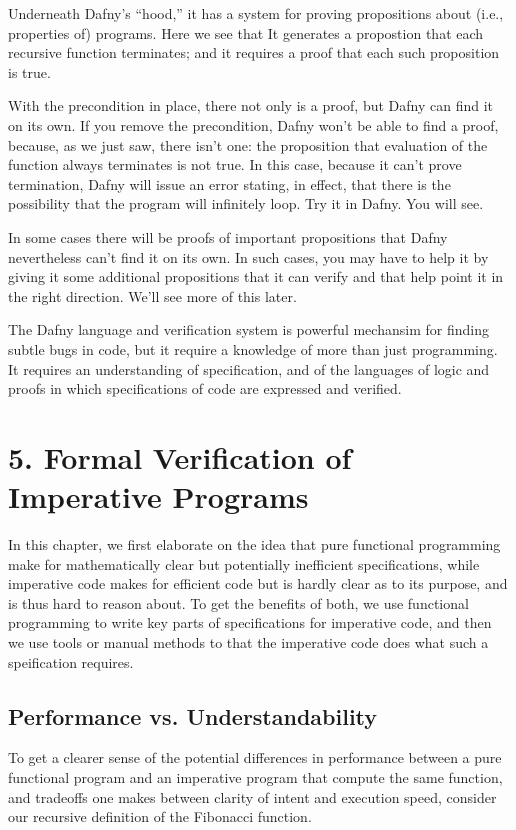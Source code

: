 \documentclass[letterpaper,10pt,english]{sphinxmanual}
\begin{document}
Underneath Dafny’s “hood,” it has a system for proving propositions
about (i.e., properties of) programs. Here we see that It generates a
propostion that each recursive function terminates; and it requires a
proof that each such proposition is true.

With the precondition in place, there not only is a proof, but Dafny
can find it on its own. If you remove the precondition, Dafny won’t be
able to find a proof, because, as we just saw, there isn’t one: the
proposition that evaluation of the function always terminates is not
true. In this case, because it can’t prove termination, Dafny will
issue an error stating, in effect, that there is the possibility that
the program will infinitely loop. Try it in Dafny.  You will see.

In some cases there will be proofs of important propositions that
Dafny nevertheless can’t find it on its own. In such cases, you may
have to help it by giving it some additional propositions that it
can verify and that help point it in the right direction. We’ll see
more of this later.

The Dafny language and verification system is powerful mechansim for
finding subtle bugs in code, but it require a knowledge of more than
just programming. It requires an understanding of specification, and
of the languages of logic and proofs in which specifications of code
are expressed and verified.


\chapter{5. Formal Verification of Imperative Programs}
\label{\detokenize{05-verifying-logical-specifications:formal-verification-of-imperative-programs}}\label{\detokenize{05-verifying-logical-specifications::doc}}
In this chapter, we first elaborate on the idea that pure functional
programming make for mathematically clear but potentially inefficient
specifications, while imperative code makes for efficient code but is
hardly clear as to its purpose, and is thus hard to reason about. To
get the benefits of both, we use functional programming to write key
parts of specifications for imperative code, and then we use tools or
manual methods to  that the imperative code does what such a
speification requires.


\section{Performance vs. Understandability}
\label{\detokenize{05-verifying-logical-specifications:performance-vs-understandability}}
To get a clearer sense of the potential differences in performance
between a pure functional program and an imperative program that
compute the same function, and tradeoffs one makes between clarity of
intent and execution speed, consider our recursive definition of the
Fibonacci function.
\end{document}
